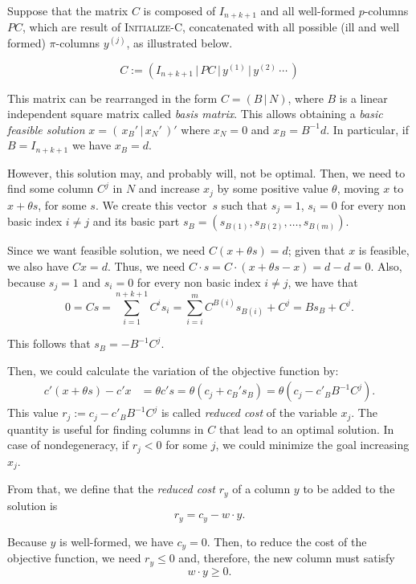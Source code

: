 Suppose that the matrix $C$ is composed of $I_{n+k+1}$ and all well-formed $p$-columns $PC$, which are result of \textsc{Initialize-C}, concatenated with all possible (ill and well formed) $\pi$-columns $y^{(j)}$, as illustrated below.

\[
	C := \left( I_{n+k+1} \, | \, PC \, | \, y^{(1)} \, | \, y^{(2)} \, \cdots \, \right)
\]

This matrix can be rearranged in the form $C = (B \, | \, N)$, where $B$ is a linear independent square matrix called \emph{basis matrix}. This allows obtaining a \emph{basic feasible solution} $x = (\, x_B' \, | \, x_N' \,)'$ where $x_N = 0$ and $x_B = B^{-1}d$. In particular, if $B = I_{n+k+1}$ we have $x_B = d$.


However, this solution may, and probably will, not be optimal. Then, we need to find some column $C^j$ in $N$ and increase $x_j$ by some positive value $\theta$, moving $x$ to $x + \theta s$, for some $s$. We create this vector~$s$ such that $s_j = 1$, $s_i = 0$ for every non basic index $i \neq j$ and its basic part $s_B = (s_{B(1)}, s_{B(2)}, \dots, s_{B(m)})$.

Since we want feasible solution, we need $C (x + \theta s) = d$; given that $x$ is feasible, we also have $C x = d$. Thus, we need $C \cdot s = C \cdot (x + \theta s - x) = d - d = 0$. Also, because $s_j = 1$ and $s_i = 0$ for every non basic index $i \neq j$, we have that
\[
	0 = C s = \sum_{i = 1}^{n + k + 1} C^i s_i = \sum_{i = i}^m C^{B(i)} s_{B(i)} + C^j = B s_B + C^j.
\]

This follows that $s_B = - B^{-1} C^j$.

Then, we could calculate the variation of the objective function by:
\begin{align*}
	c' (x + \theta s) - c'x & = \theta c's = \theta (c_j + c_B' s_B) = \theta (c_j - c'_B B^{-1} C^j).
\end{align*}
This value $r_j := c_j - c'_B B^{-1} C^j$ is called \emph{reduced cost} of the variable $x_j$. The quantity is useful for finding columns in $C$ that lead to an optimal solution. In case of nondegeneracy, if $r_j < 0$ for some $j$, we could minimize the goal increasing $x_j$.


From that, we define that the \emph{reduced cost} $r_y$ of a column $y$ to be added to the solution is
\[
	r_y = c_y - w \cdot y.
\]

Because $y$ is well-formed, we have $c_y = 0$. Then, to reduce the cost of the objective function, we need $r_y \leq 0$ and, therefore, the new column must satisfy
\begin{equation}
	\label{eq:col-restr}
	w \cdot y \geq 0.
\end{equation}

